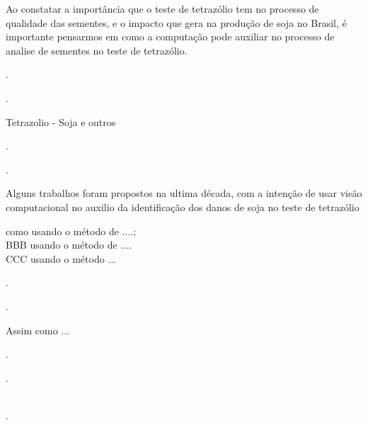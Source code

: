 

Ao constatar a importância que o teste de tetrazólio tem no processo de qualidade das sementes, e o impacto que gera na produção de soja no Brasil, é importante pensarmos em como a computação pode auxiliar no processo de analise de sementes no teste de tetrazólio.

.

.



Tetrazolio - Soja e outros 

.


.



Alguns trabalhos foram propostos na ultima década, com a intenção de usar visão computacional no auxilio da identificação dos danos de soja no teste de tetrazólio 


como \citeauthor{Rocha2016} usando o método de ....;\\
BBB usando o método de ....\\
CCC usando o método ...
	
.


.




Assim como \cite{Wendt2014, Junior2017} ... 


.

.



{\small {}} \\

.






%
